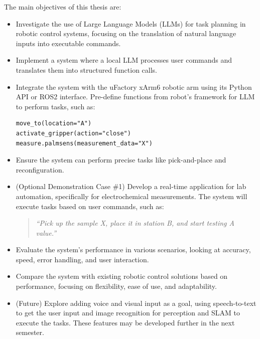 \documentclass[a4paper,11pt]{article}
\begin{document}
The main objectives of this thesis are:

\begin{itemize}
    \item Investigate the use of Large Language Models (LLMs) for task planning in robotic control systems, focusing on the translation of natural language inputs into executable commands.
    
    \item Implement a system where a local LLM processes user commands and translates them into structured function calls. 
    
    \item Integrate the system with the uFactory xArm6 robotic arm using its Python API or ROS2 interface. Pre-define functions from robot's framework for LLM to perform tasks, such as:
    \begin{verbatim}
move_to(location="A")
activate_gripper(action="close")
measure.palmsens(measurement_data="X")
    \end{verbatim}

    \item Ensure the system can perform precise tasks like pick-and-place and reconfiguration.
    
    \item (Optional Demonstration Case \#1) Develop a real-time application for lab automation, specifically for electrochemical measurements. The system will execute tasks based on user commands, such as:
    \begin{quote}
        \textit{“Pick up the sample X, place it in station B, and start testing A value.”}
    \end{quote}
    
    \item Evaluate the system’s performance in various scenarios, looking at accuracy, speed, error handling, and user interaction.
    
    \item Compare the system with existing robotic control solutions based on performance, focusing on flexibility, ease of use, and adaptability.
    
    \item (Future) Explore adding voice and visual input as a goal, using speech-to-text to get the user input and image recognition for perception and SLAM to execute the tasks. These features may be developed further in the next semester.
\end{itemize}
\end{document}
